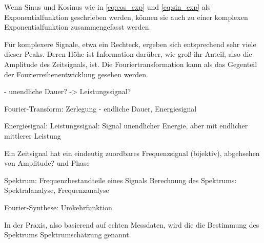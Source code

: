 Wenn Sinus und Kosinus wie in \ref{eq:cos_exp} und \ref{eq:sin_exp} als Exponentialfunktion geschrieben werden,
können sie auch zu einer komplexen Exponentialfunktion zusammengefasst werden.






Für komplexere Signale, etwa ein Rechteck, ergeben sich entsprechend sehr viele dieser Peaks. Deren Höhe ist Information darüber, wie groß ihr Anteil, also die Amplitude des 
Zeitsignals, ist. Die Fouriertransformation kann als das Gegenteil der Fourierreihenentwicklung gesehen werden.


- unendliche Dauer? -> Leistungssignal?

Fourier-Transform: Zerlegung - endliche Dauer, Energiesignal

Energiesignal:
Leistungssignal: Signal unendlicher Energie, aber mit endlicher mittlerer Leistung

Ein Zeitsignal hat ein eindeutig zuordbares Frequenzsignal (bijektiv), abgehsehen von Amplitude? und Phase

Spektrum: Frequenzbestandteile eines Signals
Berechnung des Spektrums: Spektralanalyse, Frequenzanalyse


Fourier-Synthese: Umkehrfunktion

In der Praxis, also basierend auf echten Messdaten, wird die die Bestimmung des Spektrums Spektrumschätzung genannt.
